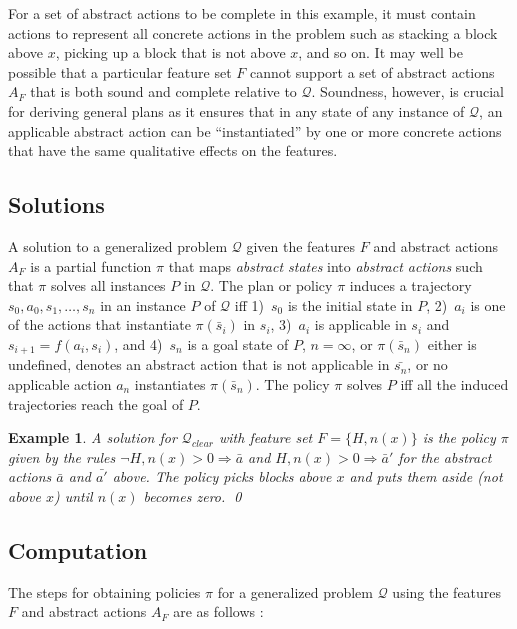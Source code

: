 \documentclass[letterpaper]{article} %
\newtheorem{example}[definition]{Example}
\newcommand{\Q}{\mathcal{Q}}
\newcommand{\Rule}[2]{\ensuremath{#1 \Rightarrow #2}}
\begin{document}
For a set of abstract actions to be complete in this example, it must
contain actions to represent all concrete actions in the problem
such as stacking a block above $x$, picking up a block that is
not above $x$, and so on.
It may well be possible that a particular feature set $F$ cannot support
a set of abstract actions $A_F$ that is both sound and complete relative
to $\Q$. Soundness, however, is crucial for deriving general plans as it
ensures that in any state of any instance of $\Q$, an applicable abstract
action  can be ``instantiated'' by one or more concrete actions that have
the same qualitative effects on the features. 


\subsection{Solutions}

A solution to a generalized problem $\Q$ given the features $F$ and abstract
actions $A_F$ is a partial function $\pi$ that maps \emph{abstract states}
into \emph{abstract actions} such that $\pi$ solves all instances $P$ in $\Q$.
The plan or policy $\pi$ induces a trajectory $s_0,a_0,s_1, \ldots, s_n$ in
an instance $P$ of $\Q$ iff
1)~$s_0$ is the initial state in $P$,
2)~$a_i$ is one of the actions that instantiate $\pi(\bar{s}_i)$ in $s_i$,
3)~$a_i$ is applicable in $s_i$ and $s_{i+1}=f(a_i,s_i)$, and
4)~$s_n$ is a goal state of $P$, $n=\infty$, or $\pi(\bar{s}_n)$ either is
undefined, denotes an abstract action that is not applicable in $\bar{s_n}$,
or no applicable action $a_n$ instantiates $\pi(\bar{s}_n)$.
The policy $\pi$ solves $P$ iff all the induced trajectories reach the
goal of $P$.

\begin{example}
  A solution for $\Q_{clear}$ with feature set
  $F=\{H,n(x)\}$ is the policy $\pi$ given by the rules
  $\Rule{\neg H, n(x)>0}{\bar{a}}$ and $\Rule{H, n(x)>0}{\bar{a}'}$
  for the abstract actions $\bar{a}$ and $\bar{a'}$ above.
  The policy picks blocks above $x$ and puts them aside (not above $x$)
  until $n(x)$ becomes zero. \qed
\end{example}


\subsection{Computation}

The steps for obtaining policies $\pi$ for a generalized problem $\Q$
using the features $F$ and abstract actions $A_F$ are as follows \cite{bonet:ijcai2018}:
\end{document}
